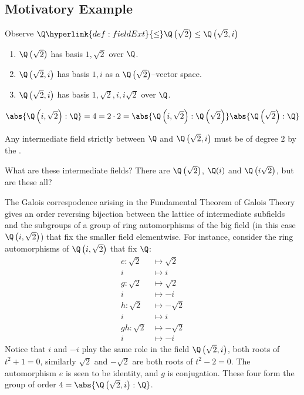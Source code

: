 \documentclass{article}
\begin{document}
\subsection{Motivatory Example}\label{sec:motivEg}
Observe $\Q \hyperlink{def:fieldExt}{\leq} \Q\left(\sqrt{2}\right) \leq \Q\left(\sqrt{2}, i\right)$
\begin{enumerate}[label=(\roman*)]
    \item $\Q\left(\sqrt{2}\right)$ has basis $1, \sqrt{2}$ over $\Q$.
    \item $\Q\left(\sqrt{2}, i\right)$ has basis $1, i$ as a $\Q\left(\sqrt{2}\right)$--vector space.
    \item $\Q\left(\sqrt{2}, i\right)$ has basis $1, \sqrt{2}, i, i\sqrt{2}$ over $\Q$.
\end{enumerate}
\begin{equation*}
    \abs{\Q\left(i, \sqrt{2}\right):\Q} = 4 = 2 \cdot 2 = \abs{\Q\left(i, \sqrt{2}\right) : \Q\left(\sqrt{2}\right)} \abs{\Q\left(\sqrt{2}\right):\Q}
\end{equation*}

Any intermediate field strictly between $\Q$ and $\Q\left(\sqrt{2}, i\right)$ must be of degree $2$ by the .


What are these intermediate fields? There are $\Q\left(\sqrt{2}\right)$, $\Q(i)$ and $\Q\left(i\sqrt{2}\right)$, but are these all?

The Galois correspodence arising in the Fundamental Theorem of Galois Theory gives an order reversing bijection between the lattice of intermediate subfields and the subgroups of a group of ring automorphisms of the big field (in this case $\Q\left(i, \sqrt{2}\right)$) that fix the smaller field elementwise.
For instance, consider the ring automorphisms of $\Q\left(i, \sqrt{2}\right)$ that fix $\Q$:
\begin{align*}
    e : \sqrt{2} &\longmapsto \sqrt{2} \\
               i &\longmapsto i \\
    g : \sqrt{2} &\longmapsto \sqrt{2} \\
               i &\longmapsto -i \\
    h : \sqrt{2} &\longmapsto -\sqrt{2} \\
               i &\longmapsto i \\
    gh: \sqrt{2} &\longmapsto -\sqrt{2} \\
               i &\longmapsto -i
\end{align*}
Notice that $i$ and $-i$ play the same role in the field $\Q\left(\sqrt{2}, i\right)$, both roots of $t^2 + 1 = 0$, similarly $\sqrt{2}$ and $-\sqrt{2}$ are both roots of $t^2 - 2 = 0$.  The automorphism $e$ is seen to be identity, and $g$ is conjugation.
These four form the group of order $4 = \abs{\Q\left(\sqrt{2}, i\right) : \Q}$.
\end{document}
